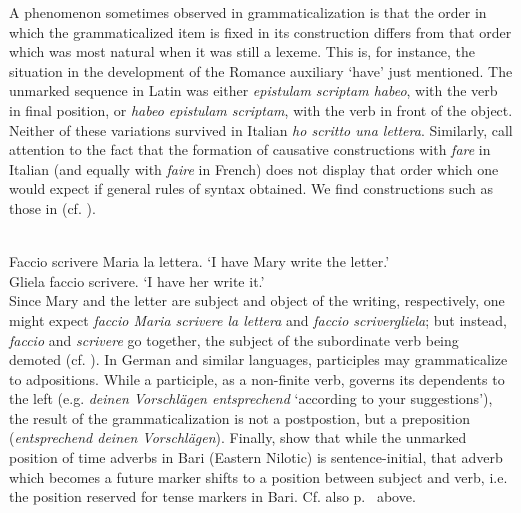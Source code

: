 A phenomenon sometimes observed in grammaticalization is that the order in which the grammaticalized item is fixed in its construction differs from that order which was most natural when it was still a lexeme. This is, for instance, the situation in the development of the Romance auxiliary ‘have’ just mentioned. The unmarked sequence in Latin was either \textit{epistulam scriptam habeo}, with the verb in final position, or \textit{habeo epistulam scriptam}, with the verb in front of the object. Neither of these variations survived in Italian \textit{ho scritto una lettera}. Similarly, \citet[423f]{MallinsonEtAl1981} call attention to the fact that the formation of causative constructions with \textit{fare} in Italian (and equally with \textit{faire} in French) does not display that order which one would expect if general rules of syntax obtained. We find constructions such as those in  (cf. \citealt[162]{Comrie1981b}).

\ea\label{ex:E112}
\langinfo{\LangItal}{}{}\\
 \ea  Faccio scrivere Maria la lettera.
 \glt ‘I have Mary write the letter.’\\
 \ex  Gliela faccio scrivere. 
\glt ‘I have her write it.’\\
\z
\z
\noindent Since Mary and the letter are subject and object of the writing, respectively, one might expect \textit{faccio Maria scrivere la lettera} and \textit{faccio scrivergliela}; but instead, \textit{faccio} and \textit{scrivere} go together, the subject of the subordinate verb being demoted (cf. \citealt[§8.2]{Comrie1981b}). In German and similar languages, participles may grammaticalize to adpositions. While a participle, as a non-finite  verb, governs its dependents to the left (e.g. \textit{deinen Vorschlägen entsprechend} ‘according to your suggestions’), the result of the grammaticalization is not a postpostion, but a preposition (\textit{entsprechend deinen Vorschlägen}). Finally, \citet[132]{HeineEtAl1984} show that while the unmarked position of time adverbs in Bari (Eastern Nilotic) is sentence-initial, that adverb which becomes a future marker shifts to a position between subject and verb, i.e. the position reserved for tense markers in Bari. Cf. also p.~\pageref{page39b}\chk%
 above.

